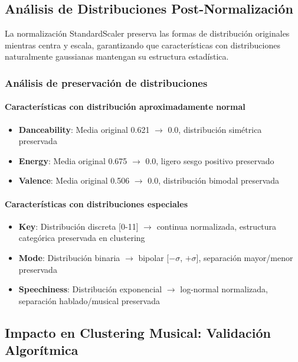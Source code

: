 \documentclass[12pt,a4paper]{article}
\begin{document}
\subsection{Análisis de Distribuciones Post-Normalización}

La normalización StandardScaler preserva las formas de distribución originales mientras centra y escala, garantizando que características con distribuciones naturalmente gaussianas mantengan su estructura estadística.

\subsubsection{Análisis de preservación de distribuciones}

\paragraph{Características con distribución aproximadamente normal}
\begin{itemize}
    \item \textbf{Danceability}: Media original 0.621 $\rightarrow$ 0.0, distribución simétrica preservada
    \item \textbf{Energy}: Media original 0.675 $\rightarrow$ 0.0, ligero sesgo positivo preservado
    \item \textbf{Valence}: Media original 0.506 $\rightarrow$ 0.0, distribución bimodal preservada
\end{itemize}

\paragraph{Características con distribuciones especiales}
\begin{itemize}
    \item \textbf{Key}: Distribución discreta [0-11] $\rightarrow$ continua normalizada, estructura categórica preservada en clustering
    \item \textbf{Mode}: Distribución binaria $\rightarrow$ bipolar [$-\sigma$, $+\sigma$], separación mayor/menor preservada
    \item \textbf{Speechiness}: Distribución exponencial $\rightarrow$ log-normal normalizada, separación hablado/musical preservada
\end{itemize}

\subsection{Impacto en Clustering Musical: Validación Algorítmica}
\end{document}
